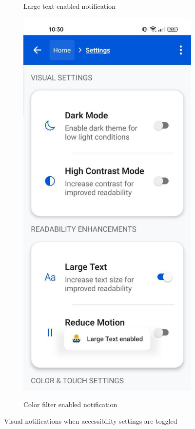 \begin{figure}[ht]
\begin{subfigure}[b]{0.48\textwidth}
        \caption{Large text enabled notification}
        \label{fig:settings-text-notification}
    \end{subfigure}
    \hfill
    \begin{subfigure}[b]{0.48\textwidth}
        \centering
        \includegraphics[width=\linewidth, alt={Settings screen with color filter enabled notification}]{img/settings2.jpg}
        \caption{Color filter enabled notification}
        \label{fig:settings-filter-notification}
    \end{subfigure}
    \caption{Visual notifications when accessibility settings are toggled}
    \label{fig:settings_notifications}
\end{figure}

